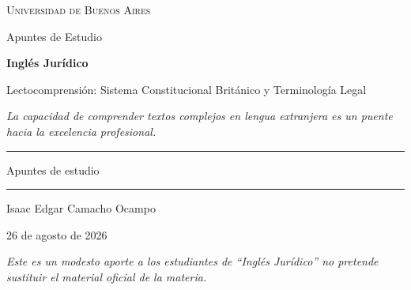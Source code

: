 \documentclass[12pt,oneside]{book}
\begin{document}

\begin{titlepage}

\thispagestyle{empty}

\begin{center}

\vspace*{1cm}

{\large \textsc{Universidad de Buenos Aires}}

\vspace{0.5cm}

{\large Apuntes de Estudio}

\vspace{3cm}

{\Huge \textbf{Inglés Jurídico}}

\vspace{1cm}

{\LARGE Lectocomprensión: Sistema Constitucional Británico y Terminología Legal}

\vspace{0.8cm}

\textit{La capacidad de comprender textos complejos en lengua extranjera es un puente hacia la excelencia profesional.}

\vspace{1.2cm}

\rule{0.70\textwidth}{0.5pt}

\vspace{0.5cm}

{\large Apuntes de estudio}

\vspace{0.5cm}

\rule{0.70\textwidth}{0.5pt}

\vfill

{\large Isaac Edgar Camacho Ocampo}

\vspace{0.3cm}

{\large 26 de agosto de 2026}

\end{center}

\vfill

\begin{flushleft}
\textit{Este es un modesto aporte a los estudiantes de ``Inglés Jurídico'' no pretende sustituir el material oficial de la materia.}
\end{flushleft}

\end{titlepage}
\end{document}
